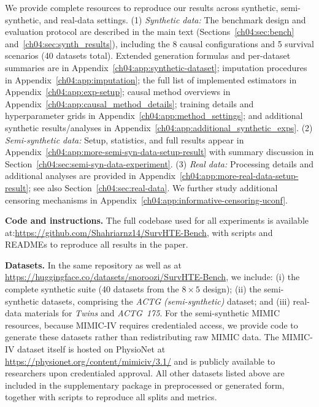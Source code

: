 
We provide complete resources to reproduce our results across synthetic, semi-synthetic, and real-data settings. 
(1) \textit{Synthetic data:} The benchmark design and evaluation protocol are described in the main text (Sections~\ref{ch04:sec:bench} and~\ref{ch04:sec:synth_results}), including the 8 causal configurations and 5 survival scenarios (40 datasets total).
Extended generation formulas and per-dataset summaries are in Appendix~\ref{ch04:app:synthetic-dataset}; imputation procedures in Appendix~\ref{ch04:app:imputation}; the full list of implemented estimators in Appendix~\ref{ch04:app:exp-setup}; causal method overviews in Appendix~\ref{ch04:app:causal_method_details}; training details and hyperparameter grids in Appendix~\ref{ch04:app:method_settings}; and additional synthetic results/analyses in Appendix~\ref{ch04:app:additional_synthetic_exps}. 
(2) \textit{Semi-synthetic data:} Setup, statistics, and full results appear in Appendix~\ref{ch04:app:more-semi-syn-data-setup-result} with summary discussion in Section~\ref{ch04:sec:semi-syn-data-experiment}. (3) \textit{Real data:} Processing details and additional analyses are provided in Appendix~\ref{ch04:app:more-real-data-setup-result}; see also Section~\ref{ch04:sec:real-data}.
We further study additional censoring mechanisms in Appendix~\ref{ch04:app:informative-censoring-uconf}.

\textbf{Code and instructions.} The full codebase used for all experiments is available at:\url{https://github.com/Shahriarnz14/SurvHTE-Bench}, with scripts and READMEs to reproduce all results in the paper.

\textbf{Datasets.} In the same repository as well as at \url{https://huggingface.co/datasets/snoroozi/SurvHTE-Bench}, we include: (i) the complete synthetic suite (40 datasets from the $8\times5$ design); (ii) the semi-synthetic datasets, comprising the \emph{ACTG (semi-synthetic)} dataset; and (iii) real-data materials for \emph{Twins} and \emph{ACTG~175}. For the semi-synthetic MIMIC resources, because MIMIC-IV requires credentialed access, we provide code to generate these datasets rather than redistributing raw MIMIC data. The MIMIC-IV dataset itself is hosted on PhysioNet at \href{https://physionet.org/content/mimiciv/3.1/}{https://physionet.org/content/mimiciv/3.1/} and is publicly available to researchers upon credentialed approval. All other datasets listed above are included in the supplementary package in preprocessed or generated form, together with scripts to reproduce all splits and metrics.

